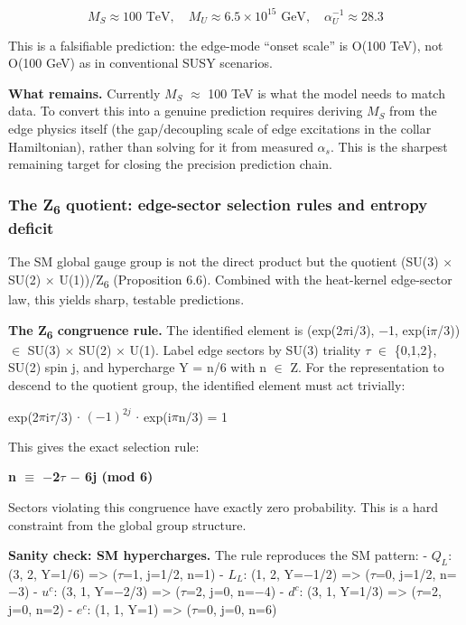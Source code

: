 \documentclass[11pt,a4paper]{article}
\theoremstyle{remark}
\begin{document}
\[
M_S \approx 100 \text{ TeV}, \quad M_U \approx 6.5 \times 10^{15} \text{ GeV}, \quad \alpha_U^{-1} \approx 28.3
\]

This is a falsifiable prediction: the edge-mode ``onset scale'' is O(100 TeV), not O(100 GeV) as in conventional SUSY scenarios.

\textbf{What remains.} Currently \(M_S\) \ensuremath{\approx} 100 TeV is what the model needs to match data. To convert this into a genuine prediction requires deriving \(M_S\) from the edge physics itself (the gap/decoupling scale of edge excitations in the collar Hamiltonian), rather than solving for it from measured \(\ensuremath{\alpha}_s\). This is the sharpest remaining target for closing the precision prediction chain.

\subsubsection{The Z\textsubscript{6} quotient: edge-sector selection rules and entropy deficit}\label{the-zux2086-quotient-edge-sector-selection-rules-and-entropy-deficit}

The SM global gauge group is not the direct product but the quotient
(SU(3) \ensuremath{\times} SU(2) \ensuremath{\times} U(1))/Z\textsubscript{6} (Proposition 6.6). Combined with
the heat-kernel edge-sector law, this yields sharp, testable predictions.

\textbf{The Z\textsubscript{6} congruence rule.} The identified element is (exp(2\ensuremath{\pi}i/3), \ensuremath{-}1, exp(i\ensuremath{\pi}/3)) \ensuremath{\in} SU(3) \ensuremath{\times} SU(2) \ensuremath{\times} U(1). Label edge sectors by SU(3) triality \ensuremath{\tau} \ensuremath{\in} \{0,1,2\}, SU(2) spin j, and hypercharge Y = n/6 with n \ensuremath{\in} Z. For the representation to descend to the quotient group, the identified element must act trivially:

exp(2\ensuremath{\pi}i\ensuremath{\tau}/3) \ensuremath{\cdot} \((\ensuremath{-}1)^{2j}\) \ensuremath{\cdot} exp(i\ensuremath{\pi}n/3) = 1

This gives the exact selection rule:

\textbf{n \ensuremath{\equiv} \ensuremath{-}2\ensuremath{\tau} \ensuremath{-} 6j (mod 6)}

Sectors violating this congruence have exactly zero probability. This is a
hard constraint from the global group structure.

\textbf{Sanity check: SM hypercharges.} The rule reproduces the SM pattern:
- \(Q_L\): (3, 2, Y=1/6) =\textgreater{} (\ensuremath{\tau}=1, j=1/2, n=1) \checkmark{}
- \(L_L\): (1, 2, Y=\ensuremath{-}1/2) =\textgreater{} (\ensuremath{\tau}=0, j=1/2, n=\ensuremath{-}3) \checkmark{}
- \(u^c\): (3, 1, Y=\ensuremath{-}2/3) =\textgreater{} (\ensuremath{\tau}=2, j=0, n=\ensuremath{-}4) \checkmark{}
- \(d^c\): (3, 1, Y=1/3) =\textgreater{} (\ensuremath{\tau}=2, j=0, n=2) \checkmark{}
- \(e^c\): (1, 1, Y=1) =\textgreater{} (\ensuremath{\tau}=0, j=0, n=6) \checkmark{}
\end{document}
